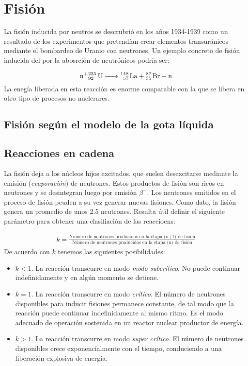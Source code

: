 \section{Fisión}

La fisión inducida por neutros se descrubrió en los años 1934-1939 como un resultado de los experimentos que pretendían crear elementos transuránicos mediante el bombardeo de Uranio con neutrones. Un ejemplo concreto de fisión inducida del  por la abosrción de neutrónicos podría ser:

\begin{equation}
\ce{n+^235_92 U -> ^148_57 La + ^87_35 Br + n}
\end{equation}
La enegía liberada en esta reacción es enorme comparable con la que se libera en otro tipo de procesos no nuclerares. 

\subsection{Fisión según el modelo de la gota líquida}

\subsection{Reacciones en cadena}

La fisión deja a los núcleos hijos excitados, que suelen desexcitarse mediante la emisión (\textit{evaporación}) de neutrones. Estos productos de fisión son ricos en neutrones y se desintegran luego por emisión $\beta^-$. Los neutrones emitidos en el proceso de fisión peuden a su vez generar nuevas fisiones. Como dato, la fisión  genera un promedio de unos 2.5 neutrones. Resulta útil definir el siguiente parámetro para obtener una clasifiación de las reaccioens:

\begin{eqnarray}    
    k = \frac{\text{Número de neutrones producidos en la etapa (n+1) de fisión}}{\text{Número de neutrones producidos en la etapa (n) de fisión}}
\end{eqnarray}
De acuerdo con $k$ tenemos las siguientes posibilidades:

\begin{itemize}
    \item $k<1$. La reacción transcurre en modo \textit{modo subcrítico}. No puede continuar indefinidamente y en algún momento se detiene.
    \item $k=1$. La reacción transcurre en modo \textit{crítico}. El número de neutrones disponibles para inducir fisiones permanece constante, de tal modo que la reacción puede continuar indefinidamente al mismo ritmo. Es el modo adecuado de operación sostenida en un reactor nuclear productor de energía.
    \item $k>1$. La reacción transcurre en modo \textit{super crítico}. El número de neutrones disponibles crece exponencialmente con el tiempo, conduciendo a una liberación explosiva de energía.
\end{itemize}

